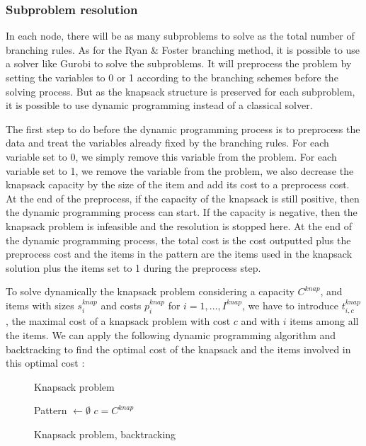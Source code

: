 \subsubsection{Subproblem resolution}

In each node, there will be as many subproblems to solve as the total number of branching rules. As for the Ryan \& Foster branching method, it is possible to use a solver like Gurobi to solve the subproblems. It will preprocess the problem by setting the variables to 0 or 1 according to the branching schemes before the solving process. But as the knapsack structure is preserved for each subproblem, it is possible to use dynamic programming instead of a classical solver. 

The first step to do before the dynamic programming process is to preprocess the data and treat the variables already fixed by the branching rules. For each variable set to 0, we simply remove this variable from the problem. For each variable set to 1, we remove the variable from the problem, we also decrease the knapsack capacity by the size of the item and add its cost to a preprocess cost. At the end of the preprocess, if the capacity of the knapsack is still positive, then the dynamic programming process can start. If the capacity is negative, then the knapsack problem is infeasible and the resolution is stopped here. At the end of the dynamic programming process, the total cost is the cost outputted plus the preprocess cost and the items in the pattern are the items used in the knapsack solution plus the items set to 1 during the preprocess step.

To solve dynamically the knapsack problem considering a capacity $C^{knap}$, and items with sizes $s_i^{knap}$ and costs $p_i^{knap}$ for $i=1,\dots, I^{knap}$, we have to introduce $t_{i,c}^{knap}$, the maximal cost of a knapsack problem with cost $c$ and with $i$ items among all the items. We can apply the following dynamic programming algorithm and backtracking to find the optimal cost of the knapsack and the items involved in this optimal cost : 
\begin{figure}[!ht]
	\centering
	\begin{minipage}[t]{0.48\linewidth}
		\begin{algorithm}[H]
			\DontPrintSemicolon 
			\caption{Knapsack problem}
		\end{algorithm}
	\end{minipage}
	\hfill
	\begin{minipage}[t]{0.49\linewidth}
		\begin{algorithm}[H]
			\DontPrintSemicolon 
			Pattern $ \leftarrow \emptyset$\;
			$c = C^{knap}$\;
			\caption{Knapsack problem, backtracking}
		\end{algorithm}
	\end{minipage}
\end{figure}

